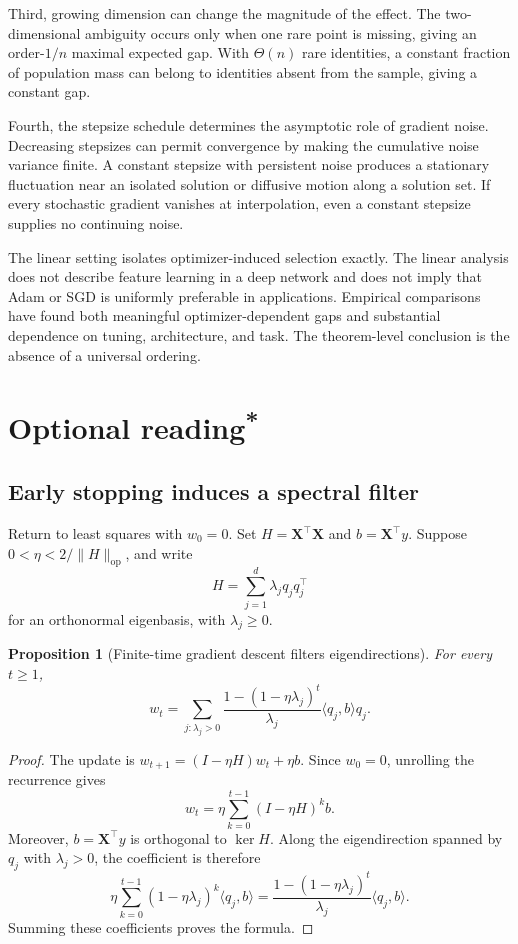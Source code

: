 \documentclass[11pt,twoside]{article}
\newcommand{\suppmark}{\texorpdfstring{\textsuperscript{*}}{*}}
\newtheorem{proposition}[theorem]{Proposition}
\theoremstyle{definition}
\theoremstyle{remark}
\begin{document}
Third, growing dimension can change the magnitude of the effect. The
two-dimensional ambiguity occurs only when one rare point is missing, giving
an order-$1/n$ maximal expected gap. With $\Theta(n)$ rare identities, a
constant fraction of population mass can belong to identities absent from the
sample, giving a constant gap.

Fourth, the stepsize schedule determines the asymptotic role of gradient
noise. Decreasing stepsizes can permit convergence by making the cumulative
noise variance finite. A constant stepsize with persistent noise produces a
stationary fluctuation near an isolated solution or diffusive motion along a
solution set. If every stochastic gradient vanishes at interpolation, even a
constant stepsize supplies no continuing noise.

The linear setting isolates optimizer-induced selection exactly. The linear
analysis does not describe feature learning in a deep network and does not
imply that Adam or SGD is uniformly preferable in applications. Empirical
comparisons have found both
meaningful optimizer-dependent gaps and substantial dependence on tuning,
architecture, and task. The theorem-level conclusion is the absence of a
universal ordering.

\section{Optional reading\suppmark}
\label{sec:optional}

\subsection{Early stopping induces a spectral filter}
\label{sec:spectral-filter}

Return to least squares with $w_0=0$. Set
$H=\mathbf X^\top\mathbf X$ and $b=\mathbf X^\top y$. Suppose
$0<\eta<2/\|H\|_{\mathrm{op}}$, and write
\[
 H=\sum_{j=1}^d\lambda_jq_jq_j^\top
\]
for an orthonormal eigenbasis, with $\lambda_j\ge0$.

\begin{proposition}[Finite-time gradient descent filters eigendirections]
\label{prop:spectral-filter}
For every $t\ge1$,
\[
 w_t=\sum_{j:\lambda_j>0}
 \frac{1-(1-\eta\lambda_j)^t}{\lambda_j}
 \langle q_j,b\rangle q_j.
\]
\end{proposition}

\begin{proof}
The update is $w_{t+1}=(I-\eta H)w_t+\eta b$. Since $w_0=0$, unrolling the
recurrence gives
\[
 w_t=\eta\sum_{k=0}^{t-1}(I-\eta H)^k b.
\]
Moreover, $b=\mathbf X^\top y$ is orthogonal to $\ker H$. Along the
eigendirection spanned by $q_j$ with $\lambda_j>0$, the coefficient is
therefore
\[
 \eta\sum_{k=0}^{t-1}(1-\eta\lambda_j)^k\langle q_j,b\rangle
 =\frac{1-(1-\eta\lambda_j)^t}{\lambda_j}
  \langle q_j,b\rangle.
\]
Summing these coefficients proves the formula.
\end{proof}
\end{document}
